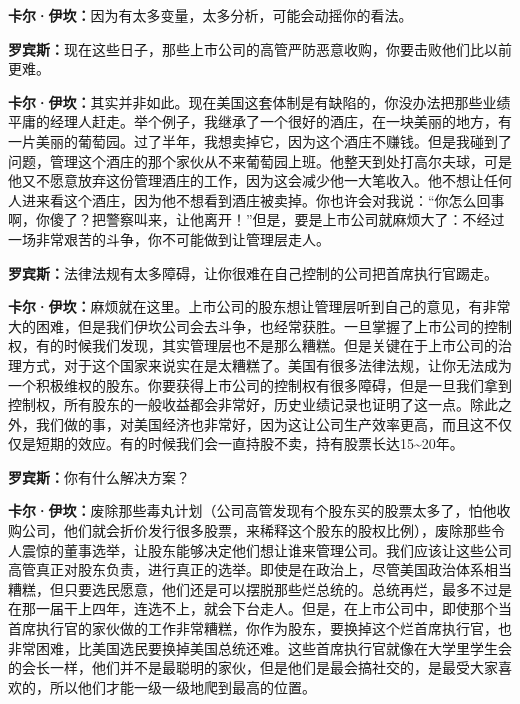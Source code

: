 \begin{BookQuote}
\textbf{卡尔·伊坎：}因为有太多变量，太多分析，可能会动摇你的看法。
\end{BookQuote}

\begin{BookQuote}
\textbf{罗宾斯：}现在这些日子，那些上市公司的高管严防恶意收购，你要击败他们比以前更难。
\end{BookQuote}

\begin{BookQuote}
\textbf{卡尔·伊坎：}其实并非如此。现在美国这套体制是有缺陷的，你没办法把那些业绩平庸的经理人赶走。举个例子，我继承了一个很好的酒庄，在一块美丽的地方，有一片美丽的葡萄园。过了半年，我想卖掉它，因为这个酒庄不赚钱。但是我碰到了问题，管理这个酒庄的那个家伙从不来葡萄园上班。他整天到处打高尔夫球，可是他又不愿意放弃这份管理酒庄的工作，因为这会减少他一大笔收入。他不想让任何人进来看这个酒庄，因为他不想看到酒庄被卖掉。你也许会对我说：“你怎么回事啊，你傻了？把警察叫来，让他离开！”但是，要是上市公司就麻烦大了：不经过一场非常艰苦的斗争，你不可能做到让管理层走人。
\end{BookQuote}

\begin{BookQuote}
\textbf{罗宾斯：}法律法规有太多障碍，让你很难在自己控制的公司把首席执行官踢走。
\end{BookQuote}

\begin{BookQuote}
\textbf{卡尔·伊坎：}麻烦就在这里。上市公司的股东想让管理层听到自己的意见，有非常大的困难，但是我们伊坎公司会去斗争，也经常获胜。一旦掌握了上市公司的控制权，有的时候我们发现，其实管理层也不是那么糟糕。但是关键在于上市公司的治理方式，对于这个国家来说实在是太糟糕了。美国有很多法律法规，让你无法成为一个积极维权的股东。你要获得上市公司的控制权有很多障碍，但是一旦我们拿到控制权，所有股东的一般收益都会非常好，历史业绩记录也证明了这一点。除此之外，我们做的事，对美国经济也非常好，因为这让公司生产效率更高，而且这不仅仅是短期的效应。有的时候我们会一直持股不卖，持有股票长达15\textasciitilde{}20年。
\end{BookQuote}

\begin{BookQuote}
\textbf{罗宾斯：}你有什么解决方案？
\end{BookQuote}

\begin{BookQuote}
\textbf{卡尔·伊坎：}废除那些毒丸计划（公司高管发现有个股东买的股票太多了，怕他收购公司，他们就会折价发行很多股票，来稀释这个股东的股权比例），废除那些令人震惊的董事选举，让股东能够决定他们想让谁来管理公司。我们应该让这些公司高管真正对股东负责，进行真正的选举。即使是在政治上，尽管美国政治体系相当糟糕，但只要选民愿意，他们还是可以摆脱那些烂总统的。总统再烂，最多不过是在那一届干上四年，连选不上，就会下台走人。但是，在上市公司中，即使那个当首席执行官的家伙做的工作非常糟糕，你作为股东，要换掉这个烂首席执行官，也非常困难，比美国选民要换掉美国总统还难。这些首席执行官就像在大学里学生会的会长一样，他们并不是最聪明的家伙，但是他们是最会搞社交的，是最受大家喜欢的，所以他们才能一级一级地爬到最高的位置。
\end{BookQuote}

